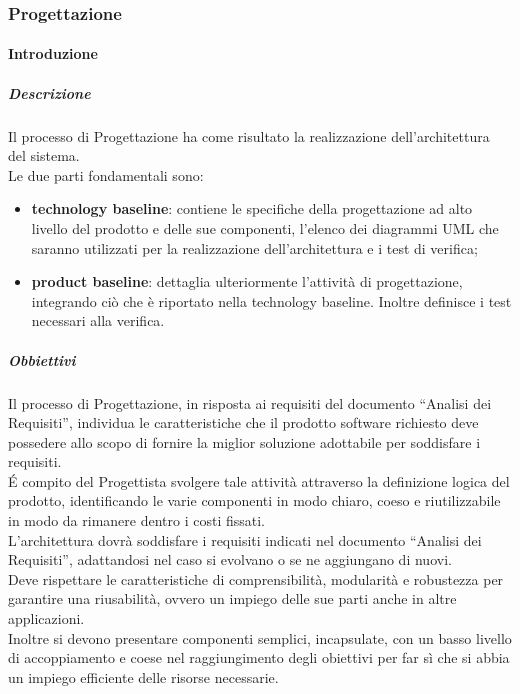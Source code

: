 		\subsubsection{Progettazione}
			\paragraph{Introduzione}
				\subparagraph{Descrizione}
					Il processo di Progettazione ha come risultato la realizzazione dell’architettura del sistema.\\
					Le due parti fondamentali sono:\\
					\begin{itemize}
						\item\textbf{technology baseline}: contiene le specifiche della progettazione ad alto livello del prodotto e delle sue componenti, l'elenco dei diagrammi UML che saranno utilizzati per la realizzazione dell'architettura e i test di verifica;
						\item\textbf{product baseline}: dettaglia ulteriormente l'attività di progettazione, integrando ciò che è riportato nella technology baseline. Inoltre definisce i test necessari alla verifica.
					\end{itemize}
				\subparagraph{Obbiettivi}
					Il processo di Progettazione, in risposta ai requisiti del documento “Analisi dei Requisiti”, individua le caratteristiche che il prodotto software richiesto deve possedere allo scopo di fornire la miglior soluzione adottabile per soddisfare i requisiti.\\
					É compito del Progettista svolgere tale attività attraverso la definizione logica del prodotto, identificando le varie componenti in modo chiaro, coeso e riutilizzabile in modo da rimanere dentro i costi fissati.\\
					L'architettura dovrà soddisfare i requisiti indicati nel documento “Analisi dei Requisiti”, adattandosi nel caso si evolvano o se ne aggiungano di nuovi. \\
					Deve rispettare le caratteristiche di comprensibilità, modularità e robustezza per garantire una riusabilità, ovvero un impiego delle sue parti anche in altre applicazioni. \\
					Inoltre si devono presentare componenti semplici, incapsulate, con un basso livello di accoppiamento e coese nel raggiungimento degli obiettivi per far sì che si abbia un impiego efficiente delle risorse necessarie.\\
					
